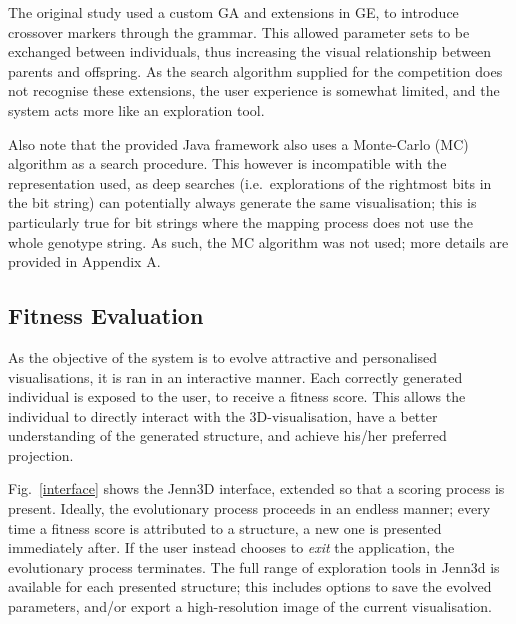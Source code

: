 \documentclass{article}
\begin{document}
The original study \cite{nicolau2011a} used a custom GA and extensions in GE,
to introduce crossover markers through the grammar. This allowed parameter sets
to be exchanged between individuals, thus increasing the visual relationship
between parents and offspring. As the search algorithm supplied for the
competition does not recognise these extensions, the user experience is
somewhat limited, and the system acts more like an exploration tool.

Also note that the provided Java framework \cite{browne2013a} also uses a
Monte-Carlo (MC) algorithm \cite{sutton98a} as a search procedure. This however is
incompatible with the representation used, as deep searches (i.e.~explorations
of the rightmost bits in the bit string) can potentially always generate the
same visualisation; this is particularly true for bit strings where the mapping
process does not use the whole genotype string. As such, the MC algorithm was
not used; more details are provided in Appendix A.

\subsection{Fitness Evaluation}

As the objective of the system is to evolve attractive and personalised
visualisations, it is ran in an interactive manner. Each correctly generated
individual is exposed to the user, to receive a fitness score. This allows the
individual to directly interact with the 3D-visualisation, have a better
understanding of the generated structure, and achieve his/her preferred
projection.

Fig.~\ref{interface} shows the Jenn3D interface, extended so that a scoring
process is present. Ideally, the evolutionary process proceeds in an endless
manner; every time a fitness score is attributed to a structure, a new one is
presented immediately after. If the user instead chooses to \textit{exit} the
application, the evolutionary process terminates. The full range of exploration
tools in Jenn3d is available for each presented structure; this includes
options to save the evolved parameters, and/or export a high-resolution image
of the current visualisation.
\end{document}

